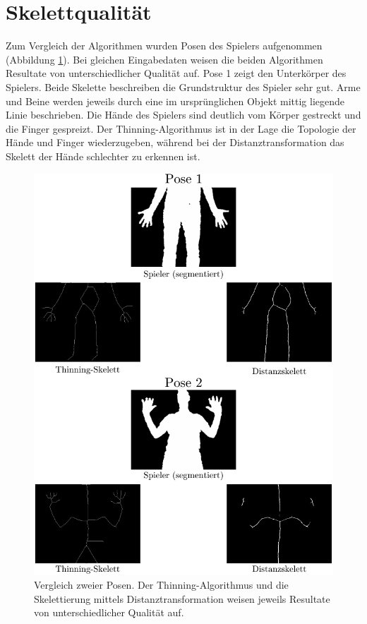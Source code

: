 \section{Skelettqualität}
Zum Vergleich der Algorithmen wurden Posen des Spielers aufgenommen (Abbildung \ref{fig:posen}). Bei gleichen Eingabedaten
weisen die beiden Algorithmen Resultate von unterschiedlicher Qualität auf. Pose 1 zeigt
den Unterkörper des Spielers. Beide Skelette beschreiben die Grundstruktur des Spieler sehr gut. Arme und Beine werden jeweils durch eine im ursprünglichen Objekt mittig liegende Linie beschrieben. Die Hände des Spielers sind deutlich vom Körper gestreckt und die Finger gespreizt. Der Thinning-Algorithmus ist in der Lage die Topologie der Hände und Finger wiederzugeben, während bei der
Distanztransformation das Skelett der Hände schlechter zu erkennen ist.
\begin{figure}[htbp]
\centering
\includegraphics[width=1.0\linewidth]{./fig/posen.pdf}
\caption{Vergleich zweier Posen. Der Thinning-Algorithmus und die Skelettierung mittels Distanztransformation weisen jeweils Resultate von unterschiedlicher Qualität auf.}
\label{fig:posen}
\end{figure}
